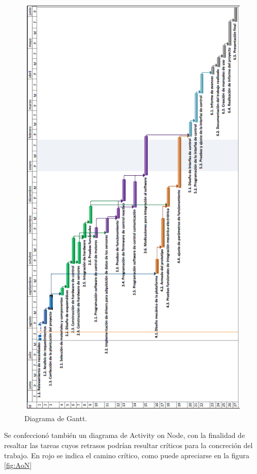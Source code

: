\begin{figure}[htpb]
\centering 
\includegraphics[width=\textwidth]{./Figures/Gantt.PNG}
\caption{Diagrama de Gantt.}
\label{fig:gantt2}
\end{figure}

\pagebreak

Se confeccionó también un diagrama de Activity on Node, con la finalidad de resaltar las tareas cuyos retrasos podrían resultar críticos para la concreción del trabajo. En rojo se indica el camino crítico, como puede apreciarse en la figura \ref{fig:AoN}

